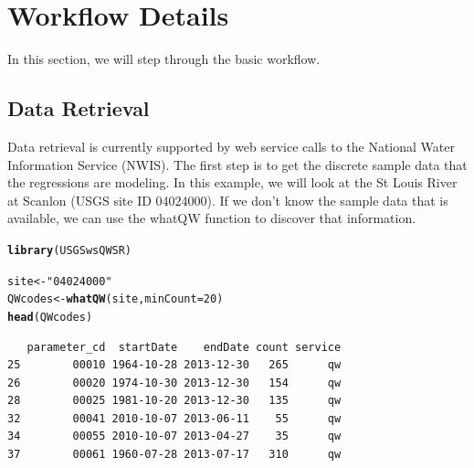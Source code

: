 \documentclass[a4paper,11pt]{article}\usepackage[]{graphicx}\usepackage[]{color}
\makeatletter
\newcommand{\hlnum}[1]{\textcolor[rgb]{0.686,0.059,0.569}{#1}}%
\newcommand{\hlstr}[1]{\textcolor[rgb]{0.192,0.494,0.8}{#1}}%
\newcommand{\hlstd}[1]{\textcolor[rgb]{0.345,0.345,0.345}{#1}}%
\newcommand{\hlkwb}[1]{\textcolor[rgb]{0.69,0.353,0.396}{#1}}%
\newcommand{\hlkwc}[1]{\textcolor[rgb]{0.333,0.667,0.333}{#1}}%
\newcommand{\hlkwd}[1]{\textcolor[rgb]{0.737,0.353,0.396}{\textbf{#1}}}%
\newenvironment{kframe}{%
 \def\at@end@of@kframe{}%
 \ifinner\ifhmode%
  \def\at@end@of@kframe{\end{minipage}}%
  \begin{minipage}{\columnwidth}%
 \fi\fi%
 \def\FrameCommand##1{\hskip\@totalleftmargin \hskip-\fboxsep
 \colorbox{shadecolor}{##1}\hskip-\fboxsep
     \hskip-\linewidth \hskip-\@totalleftmargin \hskip\columnwidth}%
 \MakeFramed {\advance\hsize-\width
   \@totalleftmargin\z@ \linewidth\hsize
   \@setminipage}}%
 {\par\unskip\endMakeFramed%
 \at@end@of@kframe}
\newenvironment{knitrout}{}{} %
\makeatother
\begin{document}
\section{Workflow Details}
\label{sec:details}
In this section, we will step through the basic workflow.

\subsection{Data Retrieval}
Data retrieval is currently supported by web service calls to the National Water Information Service (NWIS). The first step is to get the discrete sample data that the regressions are modeling. In this example, we will look at the St Louis River at Scanlon (USGS site ID 04024000). If we don't know the sample data that is available, we can use the whatQW function to discover that information. 

\begin{knitrout}
\color{fgcolor}\begin{kframe}
\begin{alltt}
\hlkwd{library}\hlstd{(USGSwsQWSR)}
\end{alltt}
\end{kframe}
\end{knitrout}






\begin{knitrout}
\color{fgcolor}\begin{kframe}
\begin{alltt}
\hlstd{site} \hlkwb{<-} \hlstr{"04024000"}
\hlstd{QWcodes} \hlkwb{<-} \hlkwd{whatQW}\hlstd{(site,} \hlkwc{minCount}\hlstd{=}\hlnum{20}\hlstd{)}
\hlkwd{head}\hlstd{(QWcodes)}
\end{alltt}
\begin{verbatim}
   parameter_cd  startDate    endDate count service
25        00010 1964-10-28 2013-12-30   265      qw
26        00020 1974-10-30 2013-12-30   154      qw
28        00025 1981-10-20 2013-12-30   135      qw
32        00041 2010-10-07 2013-06-11    55      qw
34        00055 2010-10-07 2013-04-27    35      qw
37        00061 1960-07-28 2013-07-17   310      qw
\end{verbatim}
\end{kframe}
\end{knitrout}
\end{document}

